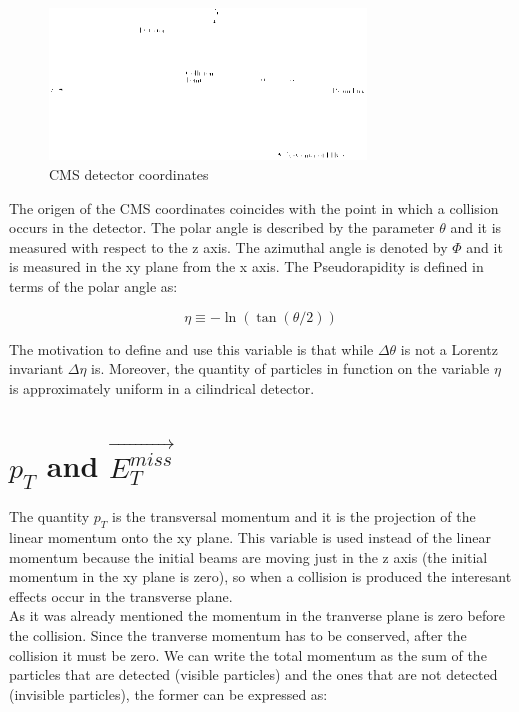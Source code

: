  \begin{figure}[h] \label{CMSCoordinates}
 \includegraphics[width=0.75\textwidth]{./Capitulos/VariableDefinitions/CMS_coordinates}  
  \caption{CMS detector coordinates}
 \end{figure}

The origen of the CMS coordinates coincides with the point in which a collision occurs in the detector. 
The polar angle is described by the parameter $\theta$ and it is measured with respect to the z axis.
The azimuthal angle is denoted by $\Phi$ and it is measured in the xy plane from the x axis. The Pseudorapidity is defined in terms of the polar angle as:

\begin{equation}
 \eta \equiv - \ln \left( \tan (\theta /2 ) \right)
\end{equation}

 The motivation to define and use this variable is that while $\Delta \theta$ is not a Lorentz invariant $\Delta \eta$ is. Moreover, the quantity of particles in function on the variable $\eta$
 is approximately uniform in a cilindrical detector. 
 
  
 \section{$p_T$ and $\vec{E_T^{miss}}$}

 The quantity $p_T$ is the transversal momentum and it is the projection of the linear momentum onto the xy plane. This variable is used instead of the linear momentum because the initial beams
 are moving just in the z axis (the initial momentum in the xy plane is zero), so when a collision is produced the interesant effects occur in the transverse plane.\\
 
 As it was already mentioned the momentum in the tranverse plane is zero before the collision. Since the tranverse momentum has to be conserved, after the collision it must be zero. We can write
 the total momentum as the sum of the particles that are detected (visible particles) and the ones that are not detected (invisible particles), the former can be expressed as:
 
